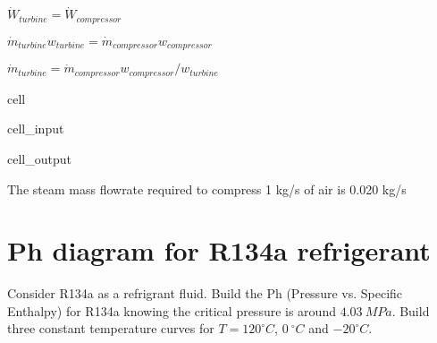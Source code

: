 \documentclass[letterpaper,10pt,english]{jupyterBook}
\begin{document}
\sphinxAtStartPar
\(\dot W_{turbine}=\dot W_{compressor}\)

\sphinxAtStartPar
\(\dot m_{turbine}w_{turbine}=\dot m_{compressor}w_{compressor}\)

\sphinxAtStartPar
\(\dot m_{turbine}=\dot m_{compressor}w_{compressor}/w_{turbine}\)

\begin{sphinxuseclass}{cell}\begin{sphinxVerbatimInput}

\begin{sphinxuseclass}{cell_input}
\begin{sphinxVerbatim}[commandchars=\\\{\}]
   
      
\end{sphinxVerbatim}

\end{sphinxuseclass}\end{sphinxVerbatimInput}
\begin{sphinxVerbatimOutput}

\begin{sphinxuseclass}{cell_output}
\begin{sphinxVerbatim}[commandchars=\\\{\}]
The steam mass flow\PYGZhy{}rate required to compress 1 kg/s of air is 0.020 kg/s
\end{sphinxVerbatim}

\end{sphinxuseclass}\end{sphinxVerbatimOutput}

\end{sphinxuseclass}
\sphinxstepscope


\section{P\sphinxhyphen{}h diagram for R\sphinxhyphen{}134a refrigerant}
\label{\detokenize{notebooks/Chapter5/CH5-Q4_v1.2:p-h-diagram-for-r-134a-refrigerant}}\label{\detokenize{notebooks/Chapter5/CH5-Q4_v1.2::doc}}
\sphinxAtStartPar
Consider R134\sphinxhyphen{}a as a refrigrant fluid. Build the P\sphinxhyphen{}h (Pressure vs. Specific Enthalpy) for R134\sphinxhyphen{}a knowing the critical pressure is around \(4.03\:MPa\). Build three constant temperature curves for \(T=120 ^{\circ}  C\), \(0\ ^{\circ}  C\) and \(-20 ^{\circ}  C\).
\end{document}
